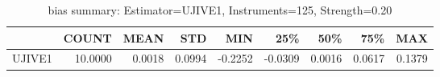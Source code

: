 \begin{table}[ht]
\centering
\caption{bias summary: Estimator=UJIVE1, Instruments=125, Strength=0.20}
\begin{tabular}{lrrrrrrrr}
\toprule
 & COUNT & MEAN & STD & MIN & 25\% & 50\% & 75\% & MAX \\
\midrule
UJIVE1 & 10.0000 & 0.0018 & 0.0994 & -0.2252 & -0.0309 & 0.0016 & 0.0617 & 0.1379 \\
\bottomrule
\end{tabular}
\end{table}
